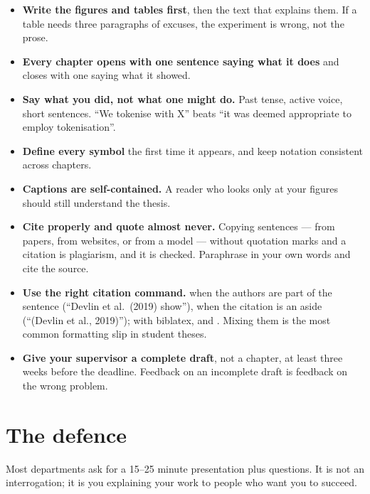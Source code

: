 \documentclass[11pt,a4paper]{article}
\begin{document}
\begin{itemize}
  \item \textbf{Write the figures and tables first}, then the text that
        explains them. If a table needs three paragraphs of excuses, the
        experiment is wrong, not the prose.
  \item \textbf{Every chapter opens with one sentence saying what it does} and
        closes with one saying what it showed.
  \item \textbf{Say what you did, not what one might do.} Past tense, active
        voice, short sentences. ``We tokenise with X'' beats ``it was deemed
        appropriate to employ tokenisation''.
  \item \textbf{Define every symbol} the first time it appears, and keep
        notation consistent across chapters.
  \item \textbf{Captions are self-contained.} A reader who looks only at your
        figures should still understand the thesis.
  \item \textbf{Cite properly and quote almost never.} Copying sentences ---
        from papers, from websites, or from a model --- without quotation
        marks and a citation is plagiarism, and it is checked. Paraphrase in
        your own words and cite the source.
  \item \textbf{Use the right citation command.}
         when the authors are part of the
        sentence (``Devlin et al.\ (2019) show''),
         when the citation is an aside
        (``(Devlin et al., 2019)''); with biblatex,
         and .
        Mixing them is the most common formatting slip in student theses.
  \item \textbf{Give your supervisor a complete draft}, not a chapter, at
        least three weeks before the deadline. Feedback on an incomplete draft
        is feedback on the wrong problem.
\end{itemize}

\section{The defence}

Most departments ask for a 15--25 minute presentation plus questions. It is not
an interrogation; it is you explaining your work to people who want you to
succeed.
\end{document}
